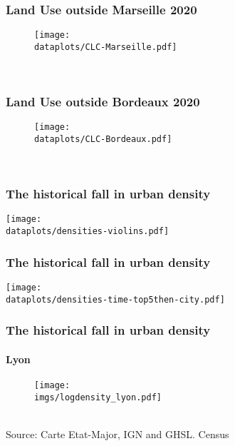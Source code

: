 \documentclass[aspectratio=169]{beamer}
\begin{document}
\begin{frame}[label=LandUseMeasureMarseille]
	\frametitle{Land Use outside Marseille 2020}
	\begin{figure}
		\begin{center}
			\texttt{[image: \\dataplots/CLC-Marseille.pdf]}
		\end{center}
	\end{figure}
	\hspace{-1cm}
	\hyperlink{CLCmeasure}{}\\
\end{frame}

\begin{frame}[label=LandUseMeasureBordeaux]
	\frametitle{Land Use outside Bordeaux 2020}
	\begin{figure}
		\begin{center}
			\texttt{[image: \\dataplots/CLC-Bordeaux.pdf]}
		\end{center}
	\end{figure}
	\hspace{-1cm}
	\hyperlink{CLCmeasure}{}\\
\end{frame}

\begin{frame}[label=violins]
\frametitle{The historical fall in urban density}
	\begin{center}
		\texttt{[image: \\dataplots/densities-violins.pdf]}
	\end{center}
\hyperlink{density}{}
\end{frame}

\begin{frame}[label=Top5]
\frametitle{The historical fall in urban density}
	\begin{center}
		\texttt{[image: \\dataplots/densities-time-top5then-city.pdf]}
	\end{center}
\hyperlink{density}{}
\end{frame}

\begin{frame}[label=Lyon]
\frametitle{The historical fall in urban density}
\framesubtitle{Lyon}
\begin{figure}
	\begin{center}
		\texttt{[image: \\imgs/logdensity\_lyon.pdf]}
	\end{center}
\end{figure}
\hyperlink{density}{}\\
{\tiny Source: Carte Etat-Major, IGN and GHSL. Census}
\end{frame}
\end{document}
